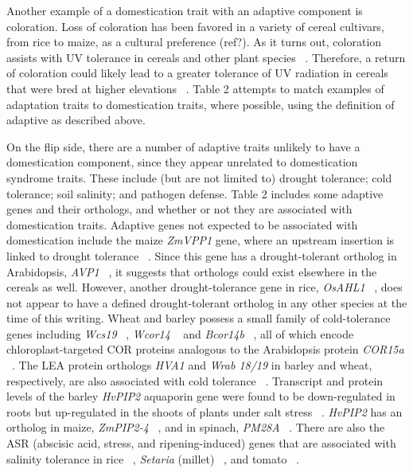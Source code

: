 \documentclass[12pt]{article}
\begin{document}
Another example of a domestication trait with an adaptive component is coloration. Loss of coloration has been favored in a variety of cereal cultivars, from rice to maize, as a cultural preference (ref?). As it turns out, coloration assists with UV tolerance in cereals and other plant species ~\citep{pmid8058838, Gould2004}. Therefore, a return of coloration could likely lead to a greater tolerance of UV radiation in cereals that were bred at higher elevations ~\citep{Pyhjrvi2013}.  Table 2 attempts to match examples of adaptation traits to domestication traits, where possible, using the definition of adaptive as described above. 

On the flip side, there are a number of adaptive traits unlikely to have a domestication component, since they appear unrelated to domestication syndrome traits. These include (but are not limited to) drought tolerance; cold tolerance; soil salinity; and pathogen defense.  Table 2 includes some adaptive genes and their orthologs, and whether or not they are associated with domestication traits.  Adaptive genes not expected to be associated with domestication include the maize \textit{ZmVPP1} gene, where an upstream insertion is linked to drought tolerance ~\citep{Wang2016}.  Since this gene has a drought-tolerant ortholog in Arabidopsis, \textit{AVP1} ~\citep{Gaxiola2001}, it suggests that orthologs could exist elsewhere in the cereals as well. However, another drought-tolerance gene in rice, \textit{OsAHL1} ~\citep{Zhou2016}, does not appear to have a defined drought-tolerant ortholog in any other species at the time of this writing. Wheat and barley possess a small family of cold-tolerance genes including \textit{Wcs19} ~\citep{pmid8219063}, \textit{Wcor14} ~\citep{pmid10846621} and \textit{Bcor14b} ~\citep{pmid9952464}, all of which encode chloroplast-targeted COR proteins analogous to the Arabidopsis protein \textit{COR15a}  ~\citep{pmid9826741, Takumi2003}. The LEA protein orthologs \textit{HVA1} and \textit{Wrab 18/19} in barley and wheat, respectively, are also associated with cold tolerance ~\citep{Hong1988, pmid16755132}. Transcript and protein levels of the barley \textit{HvPIP2} aquaporin gene were found to be down-regulated in roots but up-regulated in the shoots of plants under salt stress ~\citep{Katsuhara2002}.  \textit{HvPIP2} has an ortholog in maize, \textit{ZmPIP2-4} ~\citep{Zhu2005}, and in spinach, \textit{PM28A} ~\citep{Fotiadis2000}. There are also the ASR (abscisic acid, stress, and ripening-induced) genes that are associated with salinity tolerance in rice ~\citep{Joo2013}, \textit{Setaria} (millet) ~\citep{Li2017}, and tomato ~\citep{Konrad2008}. 
\end{document}
